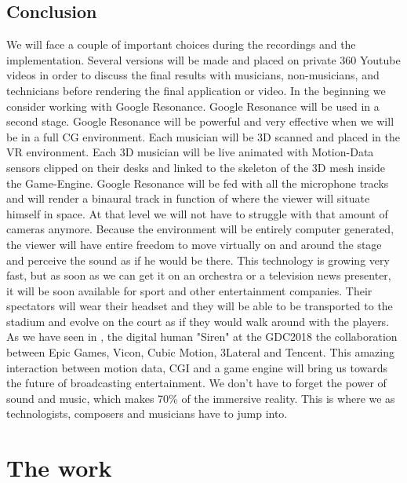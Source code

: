\documentclass[letterpaper, openright]{report}
\begin{document}
    \section{Conclusion} %
	\label{sub:conclusion}
We will face a couple of important choices during the recordings and the implementation. Several versions will be made and placed on private 360 Youtube videos in order to discuss the final results with musicians, non-musicians, and technicians before rendering the final application or video.
\newline
In the beginning we consider working with Google Resonance. Google Resonance will be used in a second stage. Google Resonance will be powerful and very effective when we will be in a full \ac{CG} environment. Each musician will be 3D scanned and placed in the \ac{VR} environment. Each 3D musician will be live animated with Motion-Data sensors clipped on their desks and linked to the skeleton of the 3D mesh inside the Game-Engine. Google Resonance will be fed with all the microphone tracks and will render a binaural track in function of where the viewer will situate himself in space. At that level we will not have to struggle with that amount of cameras anymore. Because the environment will be entirely computer generated, the viewer will have entire freedom to move virtually on and around the stage and perceive the sound as if he would be there.
\newline
This technology is growing very fast, but as soon as we can get it on an orchestra or a television news presenter, it will be soon available for sport and other entertainment companies. Their spectators will wear their headset and they will be able to be transported to the stadium and evolve on the court as if they would walk around with the players. As we have seen in \citep{Alvarez2018}, the digital human "Siren" at the GDC2018 the collaboration between Epic Games, Vicon, Cubic Motion, 3Lateral and Tencent. This amazing interaction between motion data, CGI and a game engine will bring us towards the future of broadcasting entertainment. We don't have to forget the power of sound and music, which makes 70\% of the immersive reality. This is where we as technologists, composers and musicians have to jump into.

	\vspace{0.5cm}

	\newpage
 
\chapter{The work} %
\label{sec:work}
\end{document}
